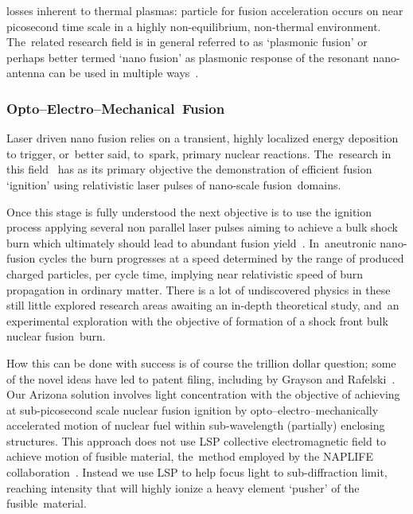 \documentclass[particles,article,accept,pdftex,moreauthors]{Definitions/mdpi}
\begin{document}
 losses inherent to thermal plasmas: particle for fusion acceleration occurs on near picosecond time scale in a highly non-equilibrium, non-thermal environment. The~related research field is in general referred to as `plasmonic fusion' or perhaps better termed `nano fusion' as plasmonic response of the resonant nano-antenna can be used in multiple ways~\cite{ChGJR2025patent}.
 

 \subsubsection{Opto--Electro--Mechanical~Fusion}\label{sssec:optoelecmechFusion}
Laser driven nano fusion relies on a transient, highly localized energy deposition to trigger, or~better said, to~spark, primary nuclear reactions. The~research in this \mbox{field~\cite{Kroo:2025HighField,Biro:2025EPJ,Csernai:2025EPJ,Kedves:2025EPJ}} has as its primary objective the demonstration of efficient fusion `ignition' using relativistic laser pulses of nano-scale fusion~domains. 

Once this stage is fully understood the next objective is to use the ignition process applying several non parallel laser pulses aiming to achieve a bulk shock burn which ultimately should lead to abundant fusion yield~\cite{Csernai:2026MDPI,Biro:2023Univ}. In~aneutronic nano-fusion cycles the burn progresses at a speed determined by the range of produced charged particles, per cycle time, implying near relativistic speed of burn propagation in ordinary matter. There is a lot of undiscovered physics in these still little explored research areas awaiting an in-depth theoretical study, and~an experimental exploration with the objective of formation of a shock front bulk nuclear fusion~burn. 

How this can be done with success is of course the trillion dollar question; some of the novel ideas have led to patent filing, including by Grayson and Rafelski~\cite{ChGJR2025patent}. Our Arizona solution involves light concentration with the objective of achieving at sub-picosecond scale nuclear fusion ignition by opto--electro--mechanically accelerated motion of nuclear fuel within sub-wavelength (partially) enclosing structures. This approach does not use LSP collective electromagnetic field to achieve motion of fusible material, the~method employed by the NAPLIFE collaboration~\cite{Kroo:2025HighField,Biro:2025EPJ,Csernai:2025EPJ,Kedves:2025EPJ}. Instead we use LSP to help focus light to sub-diffraction limit, reaching intensity that will highly ionize a heavy element `pusher' of the fusible~material.
\end{document}

